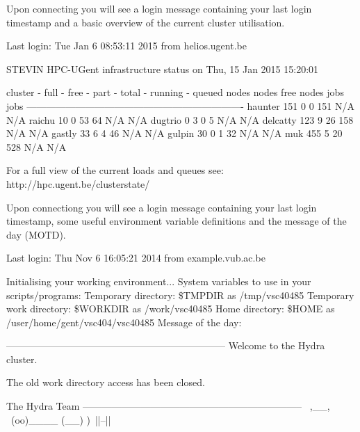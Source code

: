\ifgent
Upon connecting you will see a login message containing your last login
timestamp and a basic overview of the current cluster utilisation.
\begin{prompt}
Last login: Tue Jan  6 08:53:11 2015 from helios.ugent.be

STEVIN HPC-UGent infrastructure status on Thu, 15 Jan 2015 15:20:01

   cluster - full - free -  part - total - running - queued
             nodes  nodes   free   nodes    jobs      jobs
-------------------------------------------------------------------
   haunter    151      0      0     151      N/A       N/A
    raichu     10      0     53      64      N/A       N/A
   dugtrio      0      3      0       5      N/A       N/A
  delcatty    123      9     26     158      N/A       N/A
    gastly     33      6      4      46      N/A       N/A
    gulpin     30      0      1      32      N/A       N/A
       muk    455      5     20     528      N/A       N/A

For a full view of the current loads and queues see:
 http://hpc.ugent.be/clusterstate/

\end{prompt}
\fi
\ifbrussel
Upon connectiong you will see a login message containing your last login
timestamp, some useful environment variable definitions and the message of the
day (MOTD).
\begin{prompt}
Last login: Thu Nov  6 16:05:21 2014 from example.vub.ac.be

Initialising your working environment...
System variables to use in your scripts/programs:
  Temporary directory:   \$TMPDIR as /tmp/vsc40485
  Temporary work directory:    \$WORKDIR as /work/vsc40485
  Home directory:              \$HOME as /user/home/gent/vsc404/vsc40485
Message of the day:

  --------------------------------------------------------------------
  Welcome to the Hydra cluster.

  The old work directory access has been closed.


  The Hydra Team
  --------------------------------------------------------------------
       \   ,__,
        \  (oo)____
           (__)    )\
              ||--||

\end{prompt}
\fi

